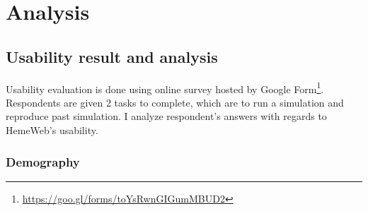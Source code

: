  

\chapter[Analysis]{Analysis}

\section{Usability result and analysis}

Usability evaluation is done using online survey hosted by Google Form\footnote{\url{https://goo.gl/forms/toYsRwnGIGumMBUD2}}. Respondents are given 2 tasks to complete, which are to run a simulation and reproduce past simulation. I analyze respondent's answers with regards to HemeWeb's usability.


\subsection{Demography}


\vspace{1cm}

\noindent%
\begin{minipage}{\linewidth}%
 \label{fig:survey-career}%
\end{minipage}

